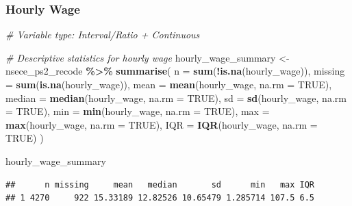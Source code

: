 \documentclass[
]{article}
\newenvironment{Shaded}{\begin{snugshade}}{\end{snugshade}}
\newcommand{\AttributeTok}[1]{\textcolor[rgb]{0.13,0.29,0.53}{#1}}
\newcommand{\CommentTok}[1]{\textcolor[rgb]{0.56,0.35,0.01}{\textit{#1}}}
\newcommand{\ConstantTok}[1]{\textcolor[rgb]{0.56,0.35,0.01}{#1}}
\newcommand{\DecValTok}[1]{\textcolor[rgb]{0.00,0.00,0.81}{#1}}
\newcommand{\FunctionTok}[1]{\textcolor[rgb]{0.13,0.29,0.53}{\textbf{#1}}}
\newcommand{\NormalTok}[1]{#1}
\newcommand{\OtherTok}[1]{\textcolor[rgb]{0.56,0.35,0.01}{#1}}
\newcommand{\SpecialCharTok}[1]{\textcolor[rgb]{0.81,0.36,0.00}{\textbf{#1}}}
\newcommand{\StringTok}[1]{\textcolor[rgb]{0.31,0.60,0.02}{#1}}
\begin{document}
\newpage

\subsubsection{Hourly Wage}\label{hourly-wage}

\begin{Shaded}
\begin{Highlighting}[]
\CommentTok{\# Variable type: Interval/Ratio + Continuous}

\CommentTok{\# Descriptive statistics for hourly wage}
\NormalTok{hourly\_wage\_summary }\OtherTok{\textless{}{-}}
\NormalTok{  nsece\_ps2\_recode }\SpecialCharTok{\%\textgreater{}\%}
  \FunctionTok{summarise}\NormalTok{(}
    \AttributeTok{n =} \FunctionTok{sum}\NormalTok{(}\SpecialCharTok{!}\FunctionTok{is.na}\NormalTok{(hourly\_wage)),}
    \AttributeTok{missing =} \FunctionTok{sum}\NormalTok{(}\FunctionTok{is.na}\NormalTok{(hourly\_wage)),}
    \AttributeTok{mean =} \FunctionTok{mean}\NormalTok{(hourly\_wage, }\AttributeTok{na.rm =} \ConstantTok{TRUE}\NormalTok{),}
    \AttributeTok{median =} \FunctionTok{median}\NormalTok{(hourly\_wage, }\AttributeTok{na.rm =} \ConstantTok{TRUE}\NormalTok{),}
    \AttributeTok{sd =} \FunctionTok{sd}\NormalTok{(hourly\_wage, }\AttributeTok{na.rm =} \ConstantTok{TRUE}\NormalTok{),}
    \AttributeTok{min =} \FunctionTok{min}\NormalTok{(hourly\_wage, }\AttributeTok{na.rm =} \ConstantTok{TRUE}\NormalTok{),}
    \AttributeTok{max =} \FunctionTok{max}\NormalTok{(hourly\_wage, }\AttributeTok{na.rm =} \ConstantTok{TRUE}\NormalTok{),}
    \AttributeTok{IQR =} \FunctionTok{IQR}\NormalTok{(hourly\_wage, }\AttributeTok{na.rm =} \ConstantTok{TRUE}\NormalTok{)}
\NormalTok{  )}

\NormalTok{hourly\_wage\_summary}
\end{Highlighting}
\end{Shaded}

\begin{verbatim}
##      n missing     mean   median       sd      min   max IQR
## 1 4270     922 15.33189 12.82526 10.65479 1.285714 107.5 6.5
\end{verbatim}

\begin{Shaded}
\end{Shaded}
\end{document}

